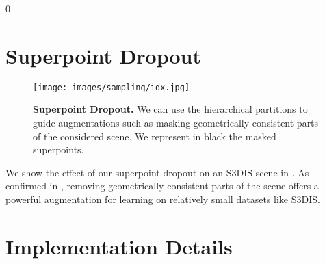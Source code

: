  0
\section{Superpoint Dropout}
\label{sec:spdropout}

\begin{figure}
\centering
\texttt{[image: images/sampling/idx.jpg]}
\caption{{\bf Superpoint Dropout.} We can use the hierarchical partitions to guide augmentations such as masking geometrically-consistent parts of the considered scene. We represent in black the masked superpoints.}
\label{fig:dropout}
\end{figure} 

We show the effect of our superpoint dropout on an S3DIS scene in . As confirmed in \textcolor{red}{}, removing geometrically-consistent parts of the scene offers a powerful augmentation for learning on relatively small datasets like S3DIS.

\fi

\section{Implementation Details}
\label{sec:implem}

